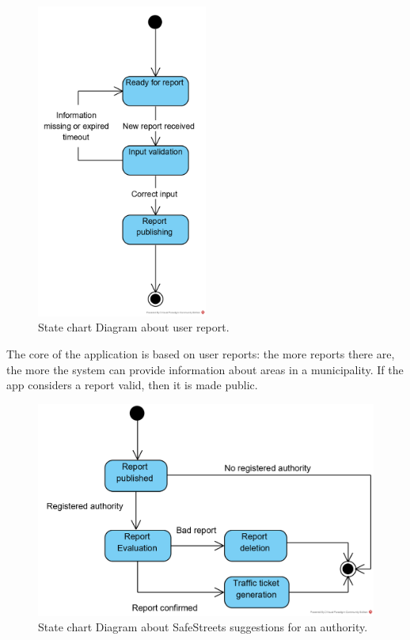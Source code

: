 \documentclass{article}
\begin{document}
			\begin{figure}[H]
				\centering
				\includegraphics[width=0.5\textwidth]{diagrams/statechart_UserSS.png}
				\caption[Statechart Diagram1]{State chart Diagram about user report.}
				\label{fig:statechart_userReporting}
			\end{figure}
			
			The core of the application is based on user reports: the more reports there are, the more the system can provide information about areas in a municipality. If the app considers a report valid, then it is made public.
			
			\begin{figure}[H]
				\centering
				\includegraphics {diagrams/statechart_AuthoritySS.png}
				\caption[State chart Diagram2]{State chart Diagram about SafeStreets suggestions for an authority.}
				\label{fig:statechart_SuggestionsForAuthority}
			\end{figure}
			
\end{document}
